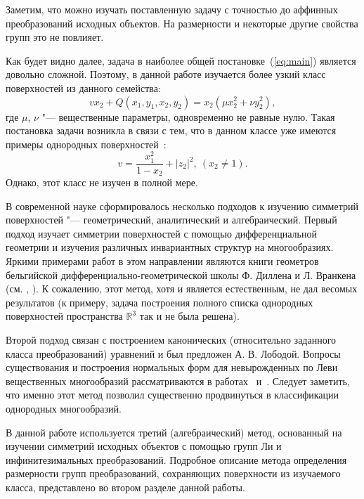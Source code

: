 \documentclass[../main.tex]{subfiles}
\begin{document}
Заметим, что можно изучать поставленную задачу с точностью до аффинных преобразований исходных объектов. На размерности и некоторые другие свойства групп это не повлияет.

Как будет видно далее, задача в наиболее общей постановке~(\ref{eq:main}) является довольно сложной. Поэтому, в данной работе изучается более узкий класс поверхностей из данного семейства:
\begin{equation}\label{eq:initial}
v x_2 + Q(x_1, y_1, x_2, y_2) = x_2 (\mu x_2^2 + \nu y_2^2),
\end{equation}
где $\mu$, $\nu$ "--- вещественные параметры, одновременно не равные нулю. Такая постановка задачи возникла в связи с тем, что в данном классе уже имеются примеры однородных поверхностей~\cite{ALS}:
\begin{equation}
v = \frac{x_1^2}{1 - x_2} + |z_2|^2,\ (x_2 \ne 1).
\end{equation}
Однако, этот класс не изучен в полной мере.

В современной науке сформировалось несколько подходов к изучению симметрий поверхностей "--- геометрический, аналитический и алгебраический. Первый подход изучает симметрии поверхностей с помощью дифференциальной геометрии и изучения различных инвариантных структур на многообразиях. Яркими примерами работ в этом направлении являются книги геометров бельгийской дифференциально-геометрической школы Ф. Диллена и Л. Вранкена (см. \cite{dillen}, \cite{vrancken}). К сожалению, этот метод, хотя и является естественным, не дал весомых результатов (к примеру, задача построения полного списка однородных поверхностей пространства $\mathbb{R}^3$ так и не была решена).

Второй подход связан с построением канонических (относительно заданного класса преобразований) уравнений и был предложен А. В. Лободой. Вопросы существования и построения нормальных форм для невырожденных по Леви вещественных многообразий рассматриваются в работах~\cite{loboda_hodarev} и~\cite{danilov}. Следует заметить, что именно этот метод позволил существенно продвинуться в классификации однородных многообразий.

В данной работе используется третий (алгебраический) метод, основанный на изучении симметрий исходных объектов с помощью групп Ли и инфинитезимальных преобразований. Подробное описание метода определения размерности групп преобразований, сохраняющих поверхности из изучаемого класса, представлено во втором разделе данной работы.
\end{document}
